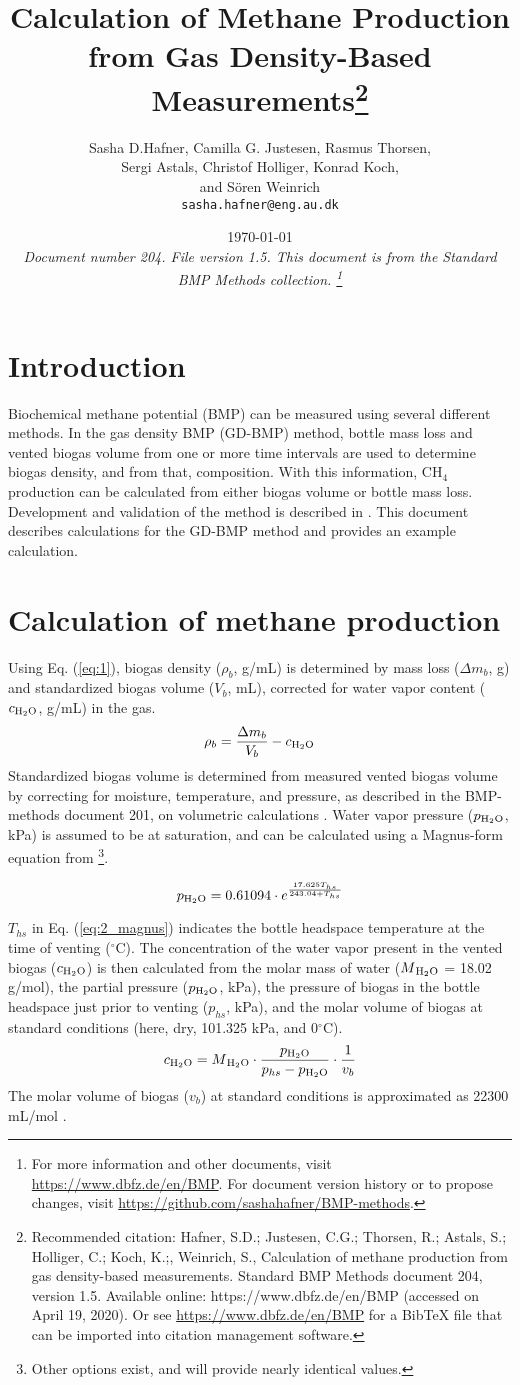 \documentclass[]{article}
\title {Calculation of Methane Production from Gas Density-Based Measurements\footnote{
  Recommended citation: 
Hafner, S.D.; Justesen, C.G.; Thorsen, R.; Astals, S.; Holliger, C.; Koch, K.;, Weinrich, S., Calculation of methane production from gas density-based measurements. Standard BMP Methods document 204, version 1.5. Available online: https://www.dbfz.de/en/BMP (accessed on April 19, 2020).
\newline
  Or see \url{https://www.dbfz.de/en/BMP} for a BibTeX file that can be imported into citation management software.
}
}
\author{Sasha D.Hafner, Camilla G. Justesen, Rasmus Thorsen, \\ Sergi Astals, Christof Holliger, Konrad Koch, \\ and S{\"o}ren Weinrich
\\
\texttt{sasha.hafner@eng.au.dk}\\
}
\date{\today \\
\bigskip
\textit{
  Document number 204.
  File version 1.5. 
  This document is from the Standard BMP Methods collection.
    \footnote{For more information and other documents, visit \url{https://www.dbfz.de/en/BMP}. 
    For document version history or to propose changes, visit \url{https://github.com/sashahafner/BMP-methods}.}
}
}
\begin{document}
\maketitle

\section{Introduction}
Biochemical methane potential (BMP) can be measured using several different methods.
In the gas density BMP (GD-BMP) method, bottle mass loss and vented biogas volume from one or more time intervals are used to determine biogas density, and from that, composition. 
With this information, CH$_4$ production can be calculated from either biogas volume or bottle mass loss.
Development and validation of the method is described in \citet{justesenDevelopmentValidationLowcost2019}.
This document describes calculations for the GD-BMP method and provides an example calculation.

\section{Calculation of methane production}
Using Eq. (\ref{eq:1}), biogas density ($\rho_b$, g/mL) is determined by mass loss ($\Delta m_b$, g) and standardized biogas volume ($V_b$, mL), corrected for water vapor content ($c\textsubscript{H$_2$O}$, g/mL) in the gas. 
\begin{equation}
  \label{eq:1}
  \rho_b=\frac{\Delta m_b}{V_b}-c\textsubscript{H$_2$O}
\end{equation}
Standardized biogas volume is determined from measured vented biogas volume by correcting for moisture, temperature, and pressure, as described in the BMP-methods document 201, on volumetric calculations \citep{BMPdoc201vol}.
Water vapor pressure ($p\textsubscript{H$_2$O}$, kPa) is assumed to be at saturation, and can be calculated using a Magnus-form equation from \citet{alduchovImprovedMagnusForm1996}\footnote{
  Other options exist, and will provide nearly identical values.
}.

\begin{equation}
\label{eq:2_magnus}
   p\textsubscript{H$_2$O} = 0.61094 \cdot e^{\frac{17.625 T_{hs}}{243.04 + T_{hs}}}
\end{equation}

$T_{hs}$ in Eq. (\ref{eq:2_magnus}) indicates the bottle headspace temperature at the time of venting ($^\circ$C). 
The concentration of the water vapor present in the vented biogas ($c\textsubscript{H$_2$O}$) is then calculated from the molar mass of water ($M\textsubscript{H$_2$O}$ = 18.02 g/mol), the partial pressure ($p\textsubscript{H$_2$O}$, kPa), the pressure of biogas in the bottle headspace just prior to venting ($p_{hs}$, kPa), and the molar volume of biogas at standard conditions (here, dry, 101.325 kPa, and 0$^\circ$C).
\begin{equation}
  \label{eq:3}
  c\textsubscript{H$_2$O}=M\textsubscript{H$_2$O} \cdot \frac{p\textsubscript{H$_2$O}}{p_{hs} - p\textsubscript{H$_2$O}} \cdot \frac{1}{v_b}
\end{equation}
The molar volume of biogas ($v_b$) at standard conditions is approximated as 22300 mL/mol \citep{hafnerValidationSimpleGravimetric2015}.
\end{document}
